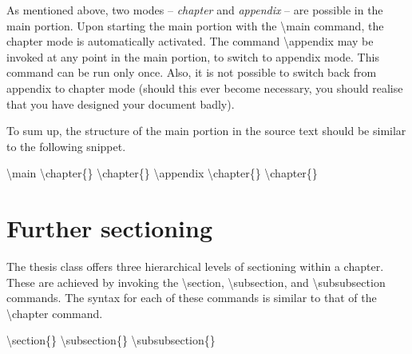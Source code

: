 \documentclass[twoside,openany]{thesis}
\begin{document}
As mentioned above, two modes -- {\itshape chapter} and {\itshape appendix} -- are possible in the main portion.
Upon starting the main portion with the {\ttfamily\textbackslash main} command, the chapter mode is automatically activated.
The command {\ttfamily\textbackslash appendix} may be invoked at any point in the main portion, to switch to appendix mode.
This command can be run only once.
Also, it is not possible to switch back from appendix to chapter mode (should this ever become necessary, you should realise that you have designed your document badly).

To sum up, the structure of the main portion in the source text should be similar to the following snippet.

{\ttfamily
    \textbackslash main\linebreak
    \textbackslash chapter\{<first chapter name>\}\linebreak
        \null{}\linebreak
    \textbackslash chapter\{<second chapter name>\}\linebreak
        \null{}\linebreak
    \textbackslash appendix\linebreak
    \textbackslash chapter\{<first appendix name>\}\linebreak
        \null{}\linebreak
    \textbackslash chapter\{<second appendix name>\}\linebreak
        \null{}
}

\section{Further sectioning}\label{sec:Further sectioning}

The {\ttfamily thesis} class offers three hierarchical levels of sectioning within a chapter.
These are achieved by invoking the {\ttfamily\textbackslash section}, {\ttfamily\textbackslash subsection}, and {\ttfamily\textbackslash subsubsection} commands.
The syntax for each of these commands is similar to that of the {\ttfamily\textbackslash chapter} command.

{\ttfamily
\textbackslash section\{<section name>\}\linebreak
\textbackslash subsection\{<subsection name>\}\linebreak
\textbackslash subsubsection\{<sub-subsection name>\}
}
\end{document}
